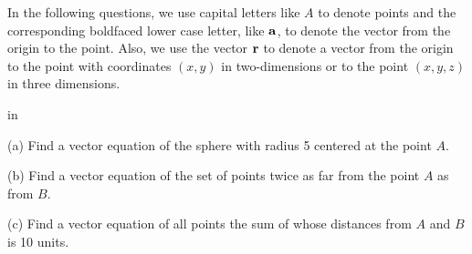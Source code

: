\documentclass{ximera}
\newcommand{\pskip}{\vskip 0.1 in}
\begin{document}
\begin{question}  \label{Eq:32404:Vectors}
In the following questions, we use capital letters like $A$ to denote points and the corresponding boldfaced lower case letter, like ${\bf a}$, to denote the vector from the origin to the point. Also, we use the vector ${\bf r}$ to denote a vector from the origin to the point with coordinates $(x,y)$ in two-dimensions or to the point $(x,y,z)$ in three dimensions.

\pskip

(a) Find a vector equation of the sphere with radius 5 centered at the point $A$.

(b) Find a vector equation of the set of points twice as far from the point $A$ as from $B$.

(c) Find a vector equation of all points the sum of whose distances from $A$ and $B$ is 10 units.


\end{question}
\end{document}
